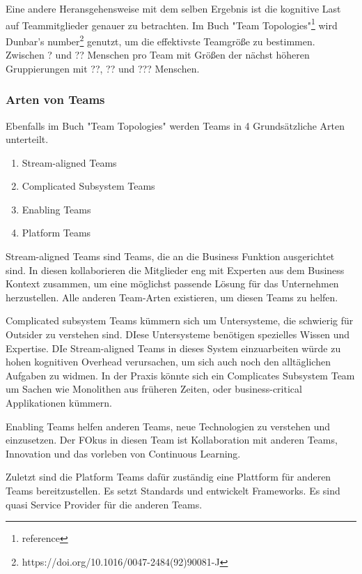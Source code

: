 Eine andere Heransgehensweise mit dem selben Ergebnis ist die kognitive Last auf
Teammitglieder genauer zu betrachten. Im Buch "Team
Topologies"\footnote{reference} wird Dunbar's
number\footnote{https://doi.org/10.1016/0047-2484(92)90081-J} genutzt, um die
effektivste Teamgröße zu bestimmen. Zwischen ? und ?? Menschen pro Team mit
Größen der nächst höheren Gruppierungen mit ??, ?? und ??? Menschen.

\subsubsection{Arten von Teams}

Ebenfalls im Buch "Team Topologies" werden Teams in 4 Grundsätzliche Arten
unterteilt.

\begin{enumerate}
  \item Stream-aligned Teams\label{team-art-stream}
  \item Complicated Subsystem Teams\label{team-art-complicated}
  \item Enabling Teams\label{team-art-enabling}
  \item Platform Teams\label{team-art-platform}
\end{enumerate}

Stream-aligned Teams sind Teams, die an die Business Funktion ausgerichtet sind.
In diesen kollaborieren die Mitglieder eng mit Experten aus dem Business Kontext
zusammen, um eine möglichst passende Lösung für das Unternehmen herzustellen.
Alle anderen Team-Arten existieren, um diesen Teams zu helfen.

Complicated subsystem Teams kümmern sich um Untersysteme, die schwierig für Outsider
zu verstehen sind. DIese Untersysteme benötigen spezielles Wissen und Expertise.
DIe Stream-aligned Teams in dieses System einzuarbeiten würde zu hohen
kognitiven Overhead verursachen, um sich auch noch den alltäglichen Aufgaben zu
widmen. In der Praxis könnte sich ein Complicates Subsystem Team um Sachen wie
Monolithen aus früheren Zeiten, oder business-critical Applikationen kümmern.

Enabling Teams helfen anderen Teams, neue Technologien zu verstehen und
einzusetzen. Der FOkus in diesen Team ist Kollaboration mit anderen Teams,
Innovation und das vorleben von Continuous Learning.

Zuletzt sind die Platform Teams dafür zuständig eine Plattform für anderen Teams
bereitzustellen. Es setzt Standards und entwickelt Frameworks. Es sind quasi
Service Provider für die anderen Teams.

